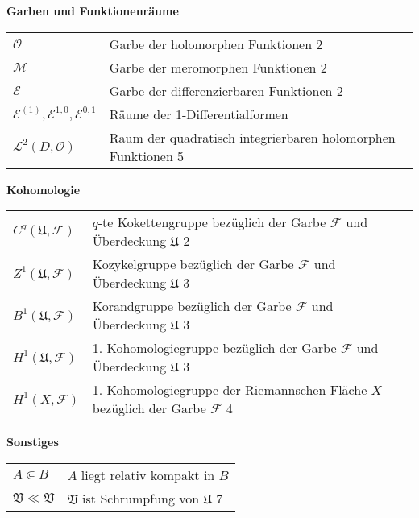 \documentclass[11pt,a4paper]{scrartcl}
\theoremstyle{thm}
\theoremstyle{def}
\theoremstyle{remark}
\begin{document}

\textbf{Garben und Funktionenräume}

\begin{longtable}{p{3.5cm} p{12cm}}
$\mathcal{O}$ & Garbe der holomorphen Funktionen  2\\
$\mathcal{M}$ & Garbe der meromorphen Funktionen  2\\
$\mathcal{E}$ & Garbe der differenzierbaren Funktionen  2\\
$\mathcal{E}^{(1)},\mathcal{E}^{1,0},\mathcal{E}^{0,1}$ & Räume der 1-Differentialformen\\
$\mathcal{L}^2(D,\mathcal{O})$ & Raum der quadratisch integrierbaren holomorphen Funktionen  5\\

\end{longtable}

\textbf{Kohomologie}

\begin{longtable}{p{3.5cm} p{12cm}}
$C^q(\mathfrak{U},\mathcal{F})$ & $q$-te Kokettengruppe bezüglich der Garbe $\mathcal{F}$ und Überdeckung $\mathfrak{U}$  2\\
$Z^1(\mathfrak{U},\mathcal{F})$ & Kozykelgruppe bezüglich der Garbe $\mathcal{F}$ und Überdeckung $\mathfrak{U}$  3\\
$B^1(\mathfrak{U},\mathcal{F})$ & Korandgruppe bezüglich der Garbe $\mathcal{F}$ und Überdeckung $\mathfrak{U}$  3\\
$H^1(\mathfrak{U},\mathcal{F})$ & 1. Kohomologiegruppe bezüglich der Garbe $\mathcal{F}$ und Überdeckung $\mathfrak{U}$  3\\
$H^1(X,\mathcal{F})$ & 1. Kohomologiegruppe der Riemannschen Fläche $X$ bezüglich der Garbe $\mathcal{F}$  4\\
\end{longtable}
\textbf{Sonstiges}
\begin{longtable}{p{3.5cm} p{12cm}}
$A\Subset B$ & $A$ liegt relativ kompakt in $B$\\
$\mathfrak{V}\ll\mathfrak{V}$ & $\mathfrak{V}$ ist Schrumpfung von $\mathfrak{U}$  7\\
\end{longtable}



\end{document}
